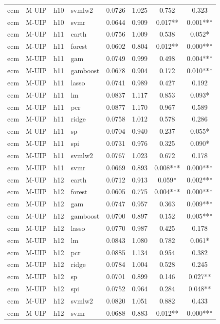 \begin{ThreePartTable}
\begin{longtable}[t]{llclcccc}
ecm & M-UIP & h10 & svmlw2 & 0.0726 & 1.025 & 0.752 & 0.323\\
ecm & M-UIP & h10 & svmr & 0.0644 & 0.909 & 0.017** & 0.001***\\
\addlinespace
ecm & M-UIP & h11 & earth & 0.0756 & 1.009 & 0.538 & 0.052*\\
ecm & M-UIP & h11 & forest & 0.0602 & 0.804 & 0.012** & 0.000***\\
ecm & M-UIP & h11 & gam & 0.0749 & 0.999 & 0.498 & 0.004***\\
ecm & M-UIP & h11 & gamboost & 0.0678 & 0.904 & 0.172 & 0.010***\\
ecm & M-UIP & h11 & lasso & 0.0741 & 0.989 & 0.427 & 0.192\\
ecm & M-UIP & h11 & lm & 0.0837 & 1.117 & 0.853 & 0.093*\\
ecm & M-UIP & h11 & pcr & 0.0877 & 1.170 & 0.967 & 0.589\\
ecm & M-UIP & h11 & ridge & 0.0758 & 1.012 & 0.578 & 0.286\\
ecm & M-UIP & h11 & sp & 0.0704 & 0.940 & 0.237 & 0.055*\\
ecm & M-UIP & h11 & spi & 0.0731 & 0.976 & 0.325 & 0.090*\\
ecm & M-UIP & h11 & svmlw2 & 0.0767 & 1.023 & 0.672 & 0.178\\
ecm & M-UIP & h11 & svmr & 0.0669 & 0.893 & 0.008*** & 0.000***\\
\addlinespace
ecm & M-UIP & h12 & earth & 0.0712 & 0.913 & 0.059* & 0.002***\\
ecm & M-UIP & h12 & forest & 0.0605 & 0.775 & 0.004*** & 0.000***\\
ecm & M-UIP & h12 & gam & 0.0747 & 0.957 & 0.363 & 0.009***\\
ecm & M-UIP & h12 & gamboost & 0.0700 & 0.897 & 0.152 & 0.005***\\
ecm & M-UIP & h12 & lasso & 0.0770 & 0.987 & 0.425 & 0.178\\
ecm & M-UIP & h12 & lm & 0.0843 & 1.080 & 0.782 & 0.061*\\
ecm & M-UIP & h12 & pcr & 0.0885 & 1.134 & 0.954 & 0.382\\
ecm & M-UIP & h12 & ridge & 0.0784 & 1.004 & 0.528 & 0.245\\
ecm & M-UIP & h12 & sp & 0.0701 & 0.899 & 0.146 & 0.027**\\
ecm & M-UIP & h12 & spi & 0.0752 & 0.964 & 0.284 & 0.048**\\
ecm & M-UIP & h12 & svmlw2 & 0.0820 & 1.051 & 0.882 & 0.433\\
ecm & M-UIP & h12 & svmr & 0.0688 & 0.883 & 0.012** & 0.000***\\

\end{longtable}
\end{ThreePartTable}
